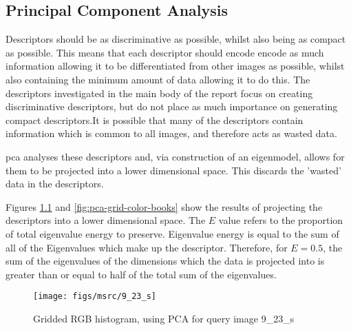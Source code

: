 \begin{appendices}
\chapter{Principal Component Analysis} \label{app:pca}
Descriptors should be as discriminative as possible, whilst also being as compact as possible. This means that each descriptor should encode encode as much information allowing it to be differentiated from other images as possible, whilst also containing the minimum amount of data allowing it to do this. The descriptors investigated in the main body of the report focus on creating discriminative descriptors, but do not place as much importance on generating compact descriptors.It is possible that many of the descriptors contain information which is common to all images, and therefore acts as wasted data.

\gls{pca} analyses these descriptors and, via construction of an eigenmodel, allows for them to be projected into a lower dimensional space. This discards the 'wasted' data in the descriptors.

Figures \ref{fig:pca-grid-color-sheep} and \ref{fig:pca-grid-color-books} show the results of projecting the descriptors into a lower dimensional space.  The $E$ value refers to the proportion of total eigenvalue energy to preserve. Eigenvalue energy is equal to the sum of all of the Eigenvalues which make up the descriptor. Therefore, for $E=0.5$, the sum of the eigenvalues of the dimensions which the data is projected into is greater than or equal to half of the total sum of the eigenvalues.


\begin{figure}[ht]
	\begin{minipage}[]{0.3\linewidth}
		\centering
		\texttt{[image: figs/msrc/9\_23\_s]}
	\end{minipage}
	\begin{minipage}[]{0.7\linewidth}
		\centering
		\prplotclose
	\end{minipage}
	\caption{Gridded RGB histogram, using PCA for query image 9\_23\_s}
	\label{fig:pca-grid-color-sheep}
\end{figure}


\end{appendices}

